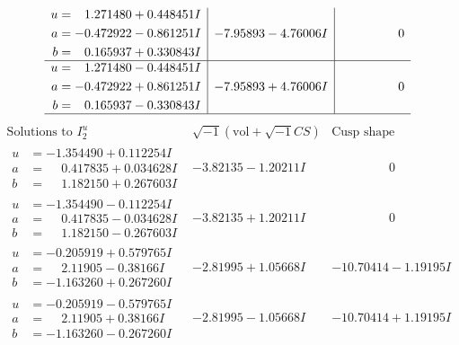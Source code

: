 \documentclass[1p]{elsarticle_modified}
\theoremstyle{definition}
\newcommand{\I}{\sqrt{-1}}
\begin{document}
$$\begin{array}{c|c|c}
\begin{aligned}
u &= \phantom{-}1.271480 + 0.448451 I \\
a &= -0.472922 - 0.861251 I \\
b &= \phantom{-}0.165937 + 0.330843 I\end{aligned}
 & -7.95893 - 4.76006 I & \phantom{-0.000000 } 0 \\ \hline\begin{aligned}
u &= \phantom{-}1.271480 - 0.448451 I \\
a &= -0.472922 + 0.861251 I \\
b &= \phantom{-}0.165937 - 0.330843 I\end{aligned}
 & -7.95893 + 4.76006 I & \phantom{-0.000000 } 0\\
 \hline 
 \end{array}$$\newpage$$\begin{array}{c|c|c}  
\text{Solutions to }I^u_{2}& \I (\text{vol} + \sqrt{-1}CS) & \text{Cusp shape}\\
 \hline 
\begin{aligned}
u &= -1.354490 + 0.112254 I \\
a &= \phantom{-}0.417835 + 0.034628 I \\
b &= \phantom{-}1.182150 + 0.267603 I\end{aligned}
 & -3.82135 - 1.20211 I & \phantom{-0.000000 } 0 \\ \hline\begin{aligned}
u &= -1.354490 - 0.112254 I \\
a &= \phantom{-}0.417835 - 0.034628 I \\
b &= \phantom{-}1.182150 - 0.267603 I\end{aligned}
 & -3.82135 + 1.20211 I & \phantom{-0.000000 } 0 \\ \hline\begin{aligned}
u &= -0.205919 + 0.579765 I \\
a &= \phantom{-}2.11905 - 0.38166 I \\
b &= -1.163260 + 0.267260 I\end{aligned}
 & -2.81995 + 1.05668 I & -10.70414 - 1.19195 I \\ \hline\begin{aligned}
u &= -0.205919 - 0.579765 I \\
a &= \phantom{-}2.11905 + 0.38166 I \\
b &= -1.163260 - 0.267260 I\end{aligned}
 & -2.81995 - 1.05668 I & -10.70414 + 1.19195 I \\ \hline\begin{aligned}

\end{aligned}
\end{array}$$
\end{document}
